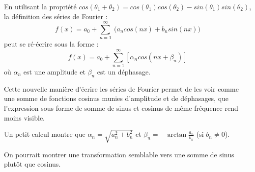 En utilisant la propriété $cos(\theta_1+\theta_2)=cos(\theta_1)cos(\theta_2)-sin(\theta_1)sin(\theta_2)$, la définition des séries de Fourier :
\begin{equation}
f(x)=a_0+\sum_{n=1}^{\infty}~\Big(a_n cos(nx) + b_n sin(nx)\Big)
\end{equation}
peut se ré-écrire sous la forme :
\begin{equation}
f(x)=a_0+\sum_{n=1}^{\infty}[\alpha_n cos(nx+\beta_n)]
\end{equation}
où $\alpha_n$ est une amplitude et $\beta_n$ est un déphasage.

Cette nouvelle manière d'écrire les séries de Fourier permet de les voir comme une somme de fonctions cosinus munies d'amplitude et de déphasages, que l'expression sous forme de somme de sinus et cosinus de même fréquence rend moins visible. 

Un petit calcul montre que \quad $\alpha_n=\sqrt{a_n^2+b_n^2}$ \quad et \quad $\beta_n=- \arctan \frac{a_n}{b_n}$ (si $b_n \neq 0$). 

On pourrait montrer une transformation semblable vers une somme de sinus plutôt que cosinus.

